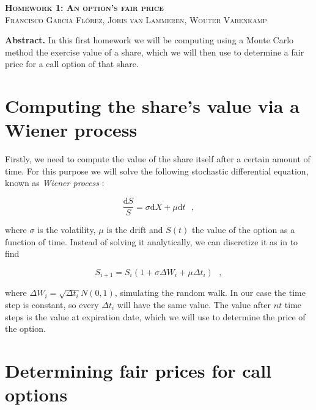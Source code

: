 \documentclass[8 pt]{article}
\newcommand{\dif}{\text{d}}
\begin{document}
\begin{minipage}{\textwidth}
    \centering
    \Large \textbf{\textsc{Homework 1: An option's fair price}}\\[0.5cm]

    \small \textsc{Francisco García Flórez, Joris van Lammeren, Wouter Varenkamp}\\[0.5cm]

    \begin{minipage}{0.6\textwidth}
      \textbf{Abstract.} In this first homework we will be computing using a Monte Carlo method the exercise value of a share, which we will then use to determine a fair price for a call option of that share.
    \end{minipage}
\end{minipage}

\section{Computing the share's value via a Wiener process}

Firstly, we need to compute the value of the share itself after a certain amount of time. For this purpose we will solve the following stochastic differential equation, known as \emph{Wiener process} \cite{Wilmott}:

\begin{equation}
  \frac{\dif S}{S} = \sigma \dif X + \mu \dif t ~~~ ,
\end{equation}

where $\sigma$ is the volatility, $\mu$ is the drift and $S(t)$ the value of the option as a function of time. Instead of solving it analytically, we can discretize it as in \cite{sde} to find

\begin{equation}
  S_{i+1} = S_i \left( 1 + \sigma \Delta W_i + \mu \Delta t_i \right) ~~~ ,
\end{equation}

where $\Delta W_i = \sqrt{\Delta t_i} N(0, 1)$, simulating the random walk. In our case the time step is constant, so every $\Delta t_i$ will have the same value. The value after $nt$ time steps is the value at expiration date, which we will use to determine the price of the option.

\section{Determining fair prices for call options}
\end{document}
